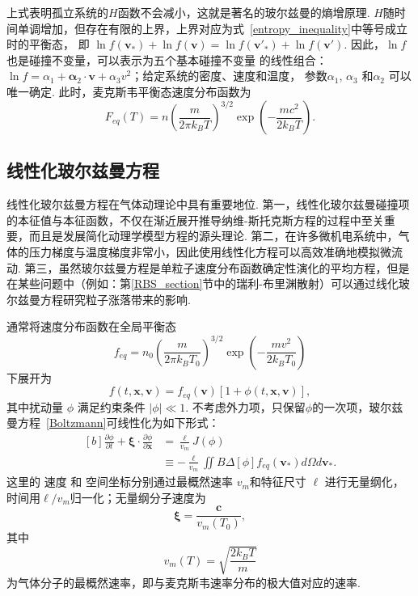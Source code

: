 上式表明孤立系统的$H$函数不会减小，这就是著名的玻尔兹曼的熵增原理. $H$随时间单调增加，但存在有限的上界，上界对应为式~\eqref{entropy_inequality}中等号成立时的平衡态， 即
$\ln{f}(\bm{v}_{\ast})+\ln{f}(\bm{v})
=\ln{f}(\bm{v}'_{\ast})+\ln{f}(\bm{v}')$. 
因此，$\ln{f}$ 也是碰撞不变量，可以表示为五个基本碰撞不变量 的线性组合：
$\ln{f}=\alpha_1+\bm{\alpha}_2\cdot\bm{v}+\alpha_3v^2$；给定系统的密度、速度和温度，
参数$\alpha_1$, $\alpha_3$ 和$\alpha_2$ 可以唯一确定. 此时，麦克斯韦平衡态速度分布函数为
\begin{equation}\label{equilibrium_Maxwellian}
F_{eq}(T)=n\left(\frac{m}{2\pi   k_BT}\right)^{3/2}\exp\left(-\frac{mc^2}{2k_BT}\right).
\end{equation}


\subsection{线性化玻尔兹曼方程}\label{LBE_chapter1}

线性化玻尔兹曼方程在气体动理论中具有重要地位. 第一，线性化玻尔兹曼碰撞项的本征值与本征函数，不仅在渐近展开推导纳维-斯托克斯方程的过程中至关重要，而且是发展简化动理学模型方程的源头理论. 第二，在许多微机电系统中，气体的压力梯度与温度梯度非常小，因此使用线性化方程可以高效准确地模拟微流动. 第三，虽然玻尔兹曼方程是单粒子速度分布函数确定性演化的平均方程，但是在某些问题中（例如：第\ref{RBS_section}节中的瑞利-布里渊散射）可以通过线化玻尔兹曼方程研究粒子涨落带来的影响. 

通常将速度分布函数在全局平衡态
\begin{equation}
f_{eq}=n_0\left(\frac{m}{2\pi   k_BT_0}\right)^{3/2}\exp\left(-\frac{mv^2}{2k_BT_0}\right)
\end{equation}
下展开为
\begin{equation}\label{chapter_vdf_lin_origin}
f(t,\bm{x},\bm{v})=f_{eq}(\bm{v})\left[1+\phi(t,\bm{x},\bm{v})\right],
\end{equation} 
其中扰动量 $\phi$ 满足约束条件 $|\phi|\ll1$. 不考虑外力项，只保留$\phi$的一次项，玻尔兹曼方程~\eqref{Boltzmann}可线性化为如下形式：
\begin{equation}\label{Chapter1_Boltzmann_lin0}
\begin{aligned}[b]
\frac{\partial\phi}{\partial t}+\bm{\xi}\cdot\frac{\partial\phi}{\partial
	\bm{x}}
&=\frac{\ell}{v_m}{J}(\phi)\\
&\equiv
-\frac{\ell}{v_m}\iint
B
\Delta[\phi]f_{eq}(\bm{v}_{\ast})d\Omega
d\bm{v}_\ast. %
\end{aligned}
\end{equation}
这里的 速度 和 空间坐标分别通过最概然速率 $v_m$和特征尺寸 $\ell$ 进行无量纲化，时间用$\ell/v_m$归一化；无量纲分子速度为
\begin{equation}
\bm{\xi}=\frac{\bm{c}}{v_m(T_0)},
\end{equation}
其中
\begin{equation}
v_m(T)=\sqrt{\frac{2k_BT}{m}}
\end{equation}
为气体分子的最概然速率，即与麦克斯韦速率分布的极大值对应的速率. 


